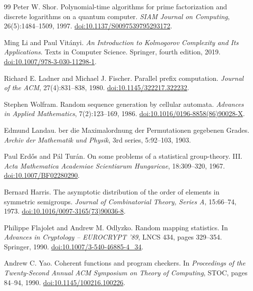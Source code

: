 \documentclass[11pt]{article}
\theoremstyle{definition}
\theoremstyle{remark}
\numberwithin{equation}{section}
\begin{document}
\begin{thebibliography}{99}
Peter W. Shor.
\newblock Polynomial-time algorithms for prime factorization and discrete
logarithms on a quantum computer.
\newblock \emph{SIAM Journal on Computing}, 26(5):1484--1509, 1997.
\newblock \href{https://doi.org/10.1137/S0097539795293172}{doi:10.1137/S0097539795293172}.

Ming Li and Paul Vit\'anyi.
\newblock \emph{An Introduction to Kolmogorov Complexity and Its
Applications}.
\newblock Texts in Computer Science. Springer, fourth edition, 2019.
\newblock \href{https://doi.org/10.1007/978-3-030-11298-1}{doi:10.1007/978-3-030-11298-1}.

Richard E. Ladner and Michael J. Fischer.
\newblock Parallel prefix computation.
\newblock \emph{Journal of the ACM}, 27(4):831--838, 1980.
\newblock \href{https://doi.org/10.1145/322217.322232}{doi:10.1145/322217.322232}.

Stephen Wolfram.
\newblock Random sequence generation by cellular automata.
\newblock \emph{Advances in Applied Mathematics}, 7(2):123--169, 1986.
\newblock \href{https://doi.org/10.1016/0196-8858(86)90028-X}{doi:10.1016/0196-8858(86)90028-X}.

Edmund Landau.
ber die {M}aximalordnung der {P}ermutationen gegebenen
{G}rades.
\newblock \emph{Archiv der Mathematik und Physik}, 3rd series, 5:92--103, 1903.

Paul Erd\H{o}s and P\'al Tur\'an.
\newblock On some problems of a statistical group-theory. {III}.
\newblock \emph{Acta Mathematica Academiae Scientiarum Hungaricae},
18:309--320, 1967.
\newblock \href{https://doi.org/10.1007/BF02280290}{doi:10.1007/BF02280290}.

Bernard Harris.
\newblock The asymptotic distribution of the order of elements in
symmetric semigroups.
\newblock \emph{Journal of Combinatorial Theory, Series A}, 15:66--74, 1973.
\newblock \href{https://doi.org/10.1016/0097-3165(73)90036-8}{doi:10.1016/0097-3165(73)90036-8}.


Philippe Flajolet and Andrew M. Odlyzko.
\newblock Random mapping statistics.
\newblock In \emph{Advances in Cryptology -- EUROCRYPT '89}, LNCS 434,
pages 329--354. Springer, 1990.
\newblock \href{https://doi.org/10.1007/3-540-46885-4_34}{doi:10.1007/3-540-46885-4\_34}.

Andrew C. Yao.
\newblock Coherent functions and program checkers.
\newblock In \emph{Proceedings of the Twenty-Second Annual ACM Symposium
on Theory of Computing}, STOC, pages 84--94, 1990.
\newblock \href{https://doi.org/10.1145/100216.100226}{doi:10.1145/100216.100226}.


\end{thebibliography}
\end{document}
